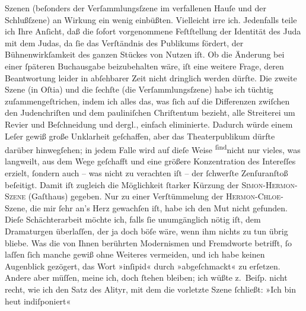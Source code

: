 \begin{ledgroupsized}[t]{13cm}
                    Szenen (beſonders der Verſammlungsſzene im verfallenen Hauſe und der
                    Schlußſzene) {\pb}an Wirkung ein wenig
                    einbüßten. Vielleicht irre ich. Jedenfalls teile ich Ihre Anſicht, daß die
                    ſofort vorgenommene Feſtſtellung der Identität des Juda mit dem Judas, da ſie
                    das Verſtändnis des Publikums fördert, der Bühnenwirkſamkeit des ganzen Stückes
                    von Nutzen iſt. Ob die Änderung bei einer ſpäteren Buchausgabe beizubehalten
                    wäre, iſt eine weitere Frage, deren Beantwortung leider in abſehbarer Zeit nicht
                    dringlich werden dürfte.\pend
           \pstart
           Die zweite Szene (in Oſtia) und die ſechſte
                    (die Verſammlungsſzene) habe ich tüchtig zuſammengeſtrichen, indem ich alles
                    das, was ſich auf die Differenzen zwiſchen den Judenchriſten und dem
                    pauliniſchen Chriſtentum bezieht, alle Streiterei um Revier und Beſchneidung und
                    dergl., einfach eliminierte. Dadurch würde einem Leſer gewiß große Unklarheit
                    geſchaffen, aber das Theaterpublikum dürfte darüber hinwegſehen; in jedem Falle
                    wird auf dieſe Weise \substVorne{}\textsuperscript{ſind}\substDazwischen{}nicht\substHinten{} nur vieles, was langweilt, aus dem Wege geſchafft und eine größere
                    Konzentration des Intereſſes erzielt, ſondern auch – {\pb}was nicht zu verachten iſt – der
                    ſchwerſte Zenſuranſtoß beſeitigt. Damit iſt zugleich die Möglichkeit ſtarker
                    Kürzung der \textsc{Simon-Hermon-Szene} (Gaſthaus) gegeben. Nur
                    zu einer Verſtümmelung der \textsc{Hermon-Chloe}-Szene, die mir
                    ſehr an’s Herz gewachſen iſt, habe ich den Mut nicht gefunden. Dieſe
                    Schächterarbeit möchte ich, falls ſie unumgänglich nötig iſt, dem Dramaturgen
                    überlaſſen, der ja doch böſe wäre, wenn ihm nichts zu tun übrig bliebe.\pend
           \pstart
           Was die von Ihnen berührten Modernismen und Fremdworte betrifft, ſo laſſen ſich
                    manche gewiß ohne Weiteres vermeiden, und ich habe keinen Augenblick gezögert,
                    das Wort »inſipid« durch »abgeſchmackt« zu erſetzen. Andere aber müſſen, meine
                    ich, doch ſtehen bleiben; ich wüßte z. Beiſp. nicht recht, wie ich den Satz des
                    Alityr, mit dem die vorletzte Szene ſchließt: »Ich bin heut indiſponiert«

\end{ledgroupsized}
